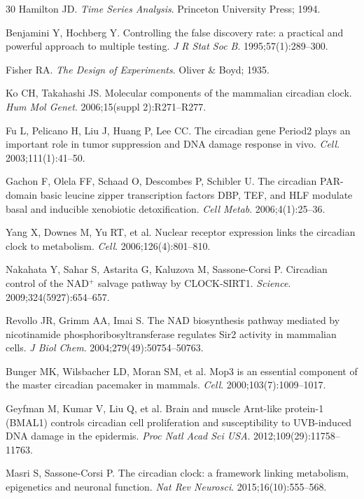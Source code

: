 \documentclass[11pt,letterpaper]{article}
\begin{document}
\begin{thebibliography}{30}
Hamilton JD.
\textit{Time Series Analysis}. Princeton University Press; 1994.

Benjamini Y, Hochberg Y.
Controlling the false discovery rate: a practical and powerful approach to multiple testing.
\textit{J R Stat Soc B}. 1995;57(1):289--300.

Fisher RA.
\textit{The Design of Experiments}. Oliver \& Boyd; 1935.

Ko CH, Takahashi JS.
Molecular components of the mammalian circadian clock.
\textit{Hum Mol Genet}. 2006;15(suppl 2):R271--R277.

Fu L, Pelicano H, Liu J, Huang P, Lee CC.
The circadian gene Period2 plays an important role in tumor suppression and DNA damage response in vivo.
\textit{Cell}. 2003;111(1):41--50.

Gachon F, Olela FF, Schaad O, Descombes P, Schibler U.
The circadian PAR-domain basic leucine zipper transcription factors DBP, TEF, and HLF modulate basal and inducible xenobiotic detoxification.
\textit{Cell Metab}. 2006;4(1):25--36.

Yang X, Downes M, Yu RT, et al.
Nuclear receptor expression links the circadian clock to metabolism.
\textit{Cell}. 2006;126(4):801--810.

Nakahata Y, Sahar S, Astarita G, Kaluzova M, Sassone-Corsi P.
Circadian control of the NAD$^+$ salvage pathway by CLOCK-SIRT1.
\textit{Science}. 2009;324(5927):654--657.

Revollo JR, Grimm AA, Imai S.
The NAD biosynthesis pathway mediated by nicotinamide phosphoribosyltransferase regulates Sir2 activity in mammalian cells.
\textit{J Biol Chem}. 2004;279(49):50754--50763.

Bunger MK, Wilsbacher LD, Moran SM, et al.
Mop3 is an essential component of the master circadian pacemaker in mammals.
\textit{Cell}. 2000;103(7):1009--1017.

Geyfman M, Kumar V, Liu Q, et al.
Brain and muscle Arnt-like protein-1 (BMAL1) controls circadian cell proliferation and susceptibility to UVB-induced DNA damage in the epidermis.
\textit{Proc Natl Acad Sci USA}. 2012;109(29):11758--11763.

Masri S, Sassone-Corsi P.
The circadian clock: a framework linking metabolism, epigenetics and neuronal function.
\textit{Nat Rev Neurosci}. 2015;16(10):555--568.


\end{thebibliography}
\end{document}
